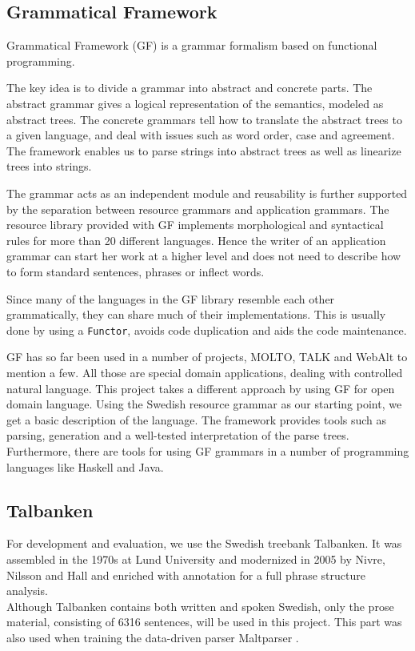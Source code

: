 \documentclass[submission]{eptcs} %
\begin{document}
\subsection{Grammatical Framework}
\label{sec:gf}


Grammatical Framework\cite{ranta-2011} (GF) is a grammar formalism based on
functional programming. 

The key idea is to divide a grammar into abstract and concrete parts. 
The abstract grammar gives a logical representation of the semantics,
modeled as abstract trees.
The concrete grammars tell how to translate the abstract trees to a given language,
and deal with issues such as word order, case and agreement. 
The framework enables us to parse strings into abstract trees as well as
linearize trees into strings.

The grammar acts as an independent module and reusability is further supported
by the separation between resource grammars and application grammars. The
resource library provided with GF implements morphological and syntactical
rules for more than 20 different languages.  Hence the writer of an application
grammar can start her work at a higher level and does not need to describe how
to form standard sentences, phrases or inflect words.

Since many of the languages in the GF library resemble each other grammatically,
they can share much of their implementations. This is usually done by using a
\verb|Functor|, avoids code duplication and aids the code maintenance.

GF has so far been used in a number of projects, MOLTO\cite{molto}, TALK\cite{talk}
and WebAlt\cite{webalt} to mention a few. 
All those are special domain applications, dealing with controlled natural
language.
This project takes a different approach by using GF for open domain language.
Using the Swedish resource grammar as our starting
point, we get a basic description of the language. The framework provides
tools such as parsing, generation and
a well-tested interpretation of the parse trees. Furthermore, there are tools
for using GF grammars in a number of programming languages like Haskell
and Java. 



\subsection{Talbanken}
For development and evaluation, we use the Swedish treebank
Talbanken\cite{talbanken}.
It was assembled in the 1970s at Lund University and modernized
in 2005 by Nivre, Nilsson and Hall\cite{talbanken05} and
enriched with annotation for a full phrase structure analysis.  \\
Although Talbanken contains both written and spoken Swedish,
only the prose material, consisting of 6316 sentences, will be used in this project.
This part was also used when training the data-driven parser Maltparser \cite{malt}. \\
\end{document}
